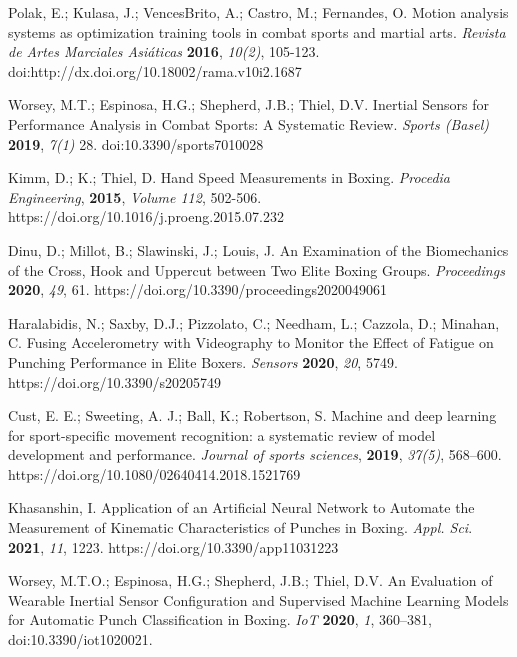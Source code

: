 \documentclass[sport,article,submit,moreauthors,pdftex]{Definitions/mdpi}
\begin{document}
\begin{thebibliography}{999}

Polak, E.; Kulasa, J.; VencesBrito, A.; Castro, M.; Fernandes, O. Motion analysis systems as optimization training tools in combat sports and martial arts. {\em Revista de Artes Marciales Asiáticas} {\bf 2016}, {\em 10(2)}, 105-123. doi:http://dx.doi.org/10.18002/rama.v10i2.1687

Worsey, M.T.; Espinosa, H.G.; Shepherd, J.B.; Thiel, D.V. Inertial Sensors for Performance Analysis in Combat Sports: A Systematic Review. {\em Sports (Basel)} {\bf 2019}, {\em 7(1)} 28. doi:10.3390/sports7010028

Kimm, D.; K.; Thiel, D. Hand Speed Measurements in Boxing. {\em Procedia Engineering}, {\bf 2015}, {\em Volume 112}, 502-506. https://doi.org/10.1016/j.proeng.2015.07.232

Dinu, D.; Millot, B.; Slawinski, J.; Louis, J. An Examination of the Biomechanics of the Cross, Hook and Uppercut between Two Elite Boxing Groups. {\em Proceedings} {\bf 2020}, {\em 49}, 61. https://doi.org/10.3390/proceedings2020049061

Haralabidis, N.; Saxby, D.J.; Pizzolato, C.; Needham, L.; Cazzola, D.; Minahan, C. Fusing Accelerometry with Videography to Monitor the Effect of Fatigue on Punching Performance in Elite Boxers. {\em Sensors} {\bf 2020}, {\em 20}, 5749. https://doi.org/10.3390/s20205749

Cust, E. E.; Sweeting, A. J.; Ball, K.; Robertson, S. Machine and deep learning for sport-specific movement recognition: a systematic review of model development and performance. {\em Journal of sports sciences}, {\bf 2019}, {\em 37(5)}, 568–600. https://doi.org/10.1080/02640414.2018.1521769

Khasanshin, I. Application of an Artificial Neural Network to Automate the Measurement of Kinematic Characteristics of Punches in Boxing. {\em Appl. Sci}. {\bf 2021}, {\em 11}, 1223. https://doi.org/10.3390/app11031223

Worsey, M.T.O.; Espinosa, H.G.; Shepherd, J.B.; Thiel, D.V. An Evaluation of Wearable Inertial Sensor Configuration and Supervised Machine Learning Models for Automatic Punch Classification in Boxing. {\em IoT} {\bf 2020}, {\em 1}, 360–381, doi:10.3390/iot1020021.


\end{thebibliography}
\end{document}
